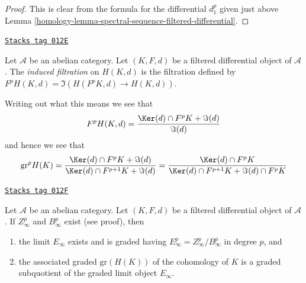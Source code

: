 \begin{proof}

This is clear from the formula for the differential $d_1^p$
given just above Lemma \ref{homology-lemma-spectral-sequence-filtered-differential}.
\end{proof}

\begin{definition}
\label{homology-definition-filtration-cohomology-filtered-differential}
\href{https://stacks.math.columbia.edu/tag/012E}{\texttt{Stacks tag 012E}}

Let $\mathcal{A}$ be an abelian category.
Let $(K, F, d)$ be a filtered differential object of $\mathcal{A}$.
The {\it induced filtration} on $H(K, d)$ is the filtration defined
by $F^pH(K, d) = \Im(H(F^pK, d) \to H(K, d))$.
\end{definition}

Writing out what this means we see that
$$
F^pH(K, d) =
\frac{\Ker(d) \cap F^pK + \Im(d)}{\Im(d)}
$$
and hence we see that
$$
\text{gr}^p H(K) =
\frac{\Ker(d) \cap F^pK + \Im(d)}{\Ker(d) \cap F^{p + 1}K + \Im(d)} =
\frac{\Ker(d) \cap F^pK}{\Ker(d) \cap F^{p + 1}K + \Im(d) \cap F^pK}
$$

\begin{lemma}
\label{homology-lemma-compute-filtered-cohomology}
\href{https://stacks.math.columbia.edu/tag/012F}{\texttt{Stacks tag 012F}}

Let $\mathcal{A}$ be an abelian category. Let $(K, F, d)$ be a filtered
differential object of $\mathcal{A}$. If $Z_\infty^p$ and $B_\infty^p$
exist (see proof), then
\begin{enumerate}
\item the limit $E_\infty$ exists and is graded having
$E_\infty^p = Z_\infty^p/B_\infty^p$ in degree $p$, and
\item the associated graded $\text{gr}(H(K))$ of the cohomology of $K$
is a graded subquotient of the graded limit object $E_\infty$.
\end{enumerate}
\end{lemma}

